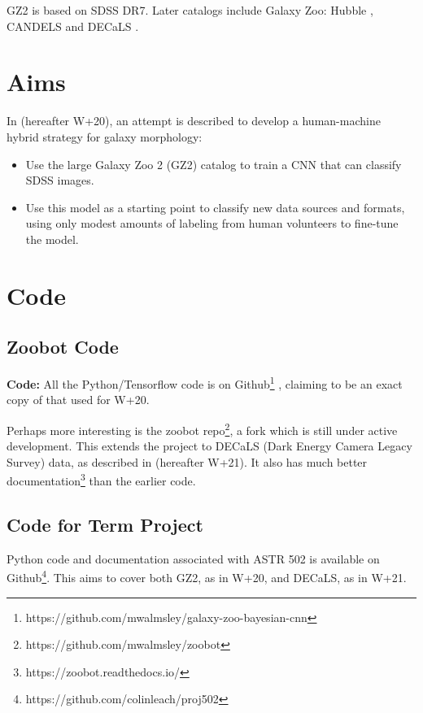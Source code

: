 \documentclass[twocolumn, twocolappendix, tighten]{aastex631}
\begin{document}
GZ2 \citep{willett_galaxy_2013, 2016MNRAS.461.3663H} is based on SDSS DR7. Later catalogs include Galaxy Zoo: Hubble \citep{2017MNRAS.464.4176W}, CANDELS \citep{2017MNRAS.464.4420S} and DECaLS \citep{walmsley_galaxy_2022}.

\section{Aims}

In \citet{walmsley_galaxy_2020} (hereafter W+20), an attempt is described to develop a human-machine hybrid strategy for galaxy morphology:
\begin{itemize}
	\item Use the large Galaxy Zoo 2 (GZ2) catalog to train a CNN that can classify SDSS images.
	\item Use this model as a starting point to classify new data sources and formats, using only modest amounts of labeling from human volunteers to fine-tune the model.
\end{itemize}


\section{Code} \label{sec:code}

\subsection{Zoobot Code} \label{sec:zcode}

\textbf{Code:} All the Python/Tensorflow code is on Github\footnote{https://github.com/mwalmsley/galaxy-zoo-bayesian-cnn} \citep{walmsley_mwalmsleygalaxy-zoo-bayesian-cnn_2019}, claiming to be an exact copy of that used for W+20.

Perhaps more interesting is the zoobot repo\footnote{https://github.com/mwalmsley/zoobot}, a fork which is still under active development. This extends the project to DECaLS (Dark Energy Camera Legacy Survey) data, as described in \citet{2021MNRAS} (hereafter W+21). It also has much better documentation\footnote{https://zoobot.readthedocs.io/} than the earlier code.

\subsection{Code for Term Project}

Python code and documentation associated with ASTR 502 is available on Github\footnote{https://github.com/colinleach/proj502}. This aims to cover both GZ2, as in W+20, and DECaLS, as in W+21.
\end{document}
